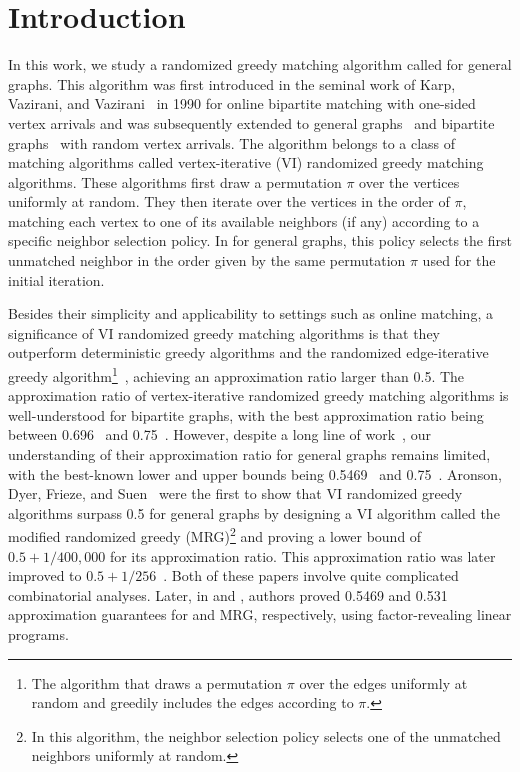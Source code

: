 \vspace{-1cm}
\section{Introduction}
In this work, we study a randomized greedy matching algorithm called {\em \rnk{}} for general graphs. This algorithm was first introduced in the seminal work of Karp, Vazirani, and Vazirani~\cite{karp1990optimal} in 1990 for online bipartite matching with one-sided vertex arrivals and was subsequently extended to general graphs~\cite{DBLP:conf/focs/GoelT12} and bipartite graphs~\cite{DBLP:conf/stoc/MahdianY11} with random vertex arrivals. The algorithm belongs to a class of matching algorithms called vertex-iterative (VI) randomized greedy matching algorithms. These algorithms first draw a permutation $\pi$ over the vertices uniformly at random. They then iterate over the vertices in the order of $\pi$, matching each vertex to one of its available neighbors (if any) according to a specific neighbor selection policy. In \rnk{} for general graphs, this policy selects the first unmatched neighbor in the order given by the same permutation $\pi$ used for the initial iteration.


Besides their simplicity and applicability to settings such as online matching, a significance of VI randomized greedy matching algorithms is that they outperform deterministic greedy algorithms and the randomized edge-iterative greedy algorithm\footnote{The algorithm that draws a permutation $\pi$ over the edges uniformly at random and greedily includes the edges according to $\pi$.}~\cite{DBLP:journals/rsa/DyerF91}, achieving an approximation ratio larger than 0.5. The approximation ratio of vertex-iterative randomized greedy matching algorithms is well-understood for bipartite graphs, with the best approximation ratio being between 0.696~\cite{DBLP:conf/stoc/MahdianY11} and 0.75~\cite{DBLP:conf/focs/GoelT12}. However, despite a long line of work~\cite{DBLP:journals/rsa/AronsonDFS95, poloczek2012randomized, chan2014ranking, DBLP:conf/stoc/TangW020, DBLP:conf/focs/GoelT12,0.546ranking}, our understanding of their approximation ratio for general graphs remains limited, with the best-known lower and upper bounds being 0.5469~\cite{0.546ranking} and 0.75~\cite{DBLP:conf/focs/GoelT12}. Aronson, Dyer, Frieze, and Suen~\cite{DBLP:journals/rsa/AronsonDFS95} were the first to show that VI randomized greedy algorithms surpass 0.5 for general graphs by designing a VI algorithm called the modified randomized greedy (MRG)\footnote{In this algorithm, the neighbor selection policy selects one of the unmatched neighbors uniformly at random.} and proving a lower bound of $0.5+1/400,000$ for its approximation ratio. This approximation ratio was later improved to $0.5+1/256$~\cite{poloczek2012randomized}. Both of these papers involve quite complicated combinatorial analyses. Later, in \cite{0.546ranking} and \cite{DBLP:conf/stoc/TangW020}, authors proved 0.5469 and 0.531 approximation guarantees for \rnk{} and MRG, respectively, using factor-revealing linear programs.


